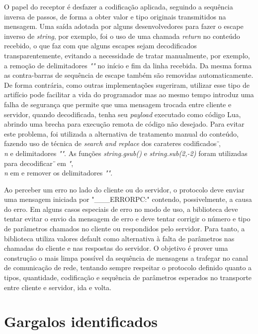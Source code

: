 \documentclass[11pt]{article}
\begin{document}
O papel do receptor é desfazer a codificação aplicada, seguindo a sequência
inversa de passos, de forma a obter valor e tipo originais transmitidos na
mensagem. Uma saída adotada por alguns desenvolvedores para fazer o escape
inverso de \textit{string}, por exemplo, foi o uso de uma chamada
\textit{return} no conteúdo recebido, o que faz com que alguns escapes sejam
decodificados transparentemente, evitando a necessidade de tratar manualmente,
por exemplo, a remoção de delimitadores \textit{""} no início e fim da linha recebida. Da
mesma forma as contra-barras de sequência de escape também são removidas
automaticamente. De forma contrária, como outras implementações sugeriram,
utilizar esse tipo de artifício pode facilitar a vida do programador mas ao mesmo
tempo introduz uma falha de segurança que permite que uma mensagem trocada
entre cliente e servidor, quando decodificada, tenha seu \textit{payload}
executado como código Lua, abrindo uma brecha para execução remota de código não
desejado. Para evitar este problema, foi utilizada a alternativa de tratamento
manual do conteúdo, fazendo uso de técnica de \textit{search and replace} dos
carateres codificados \textit{\"}, \textit{\\n} e delimitadores \textit{""}. As funções
\textit{string.gsub()} e \textit{string.sub(2,-2)} foram utilizadas para
decodificar \textit{\"} em \textit{"}, \textit{\\n} em \textit{\n} e remover os
delimitadores \textit{""}.

Ao perceber um erro no lado do cliente ou do servidor, o protocolo deve enviar
uma mensagem iniciada por "___ERRORPC:" contendo, possivelmente, a causa do
erro. Em alguns casos especiais de erro no modo de uso, a biblioteca deve tentar evitar
o envio da mensagem de erro e deve tentar corrigir o número e tipo de parâmetros chamados no
cliente ou respondidos pelo servidor. Para tanto, a biblioteca utiliza valores default como
alternativa à falta de parâmetros nas chamadas do cliente e nas respostas do
servidor. O objetivo é prover uma construção o mais limpa possível da sequência
de mensagens a trafegar no canal de comunicação de rede, tentando sempre respeitar o
protocolo definido quanto a tipos, quantidade, codificação e sequência de
parâmetros esperados no transporte entre cliente e servidor, ida e volta.

\section{Gargalos identificados}\label{sec:bottle}
\end{document}
